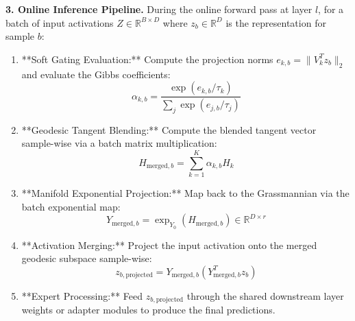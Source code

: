 \textbf{3. Online Inference Pipeline.}
During the online forward pass at layer $l$, for a batch of input activations $Z \in \mathbb{R}^{B \times D}$ where $z_b \in \mathbb{R}^D$ is the representation for sample $b$:
\begin{enumerate}
    \item **Soft Gating Evaluation:** Compute the projection norms $e_{k, b} = \|V_k^T z_b\|_2$ and evaluate the Gibbs coefficients:
    \begin{equation}
        \alpha_{k, b} = \frac{\exp(e_{k, b} / \tau_k)}{\sum_j \exp(e_{j, b} / \tau_j)}
    \end{equation}
    \item **Geodesic Tangent Blending:** Compute the blended tangent vector sample-wise via a batch matrix multiplication:
    \begin{equation}
        H_{\text{merged}, b} = \sum_{k=1}^K \alpha_{k, b} H_k
    \end{equation}
    \item **Manifold Exponential Projection:** Map back to the Grassmannian via the batch exponential map:
    \begin{equation}
        Y_{\text{merged}, b} = \exp_{Y_0}(H_{\text{merged}, b}) \in \mathbb{R}^{D \times r}
    \end{equation}
    \item **Activation Merging:** Project the input activation onto the merged geodesic subspace sample-wise:
    \begin{equation}
        z_{b, \text{projected}} = Y_{\text{merged}, b} \left(Y_{\text{merged}, b}^T z_b\right)
    \end{equation}
    \item **Expert Processing:** Feed $z_{b, \text{projected}}$ through the shared downstream layer weights or adapter modules to produce the final predictions.
\end{enumerate}

